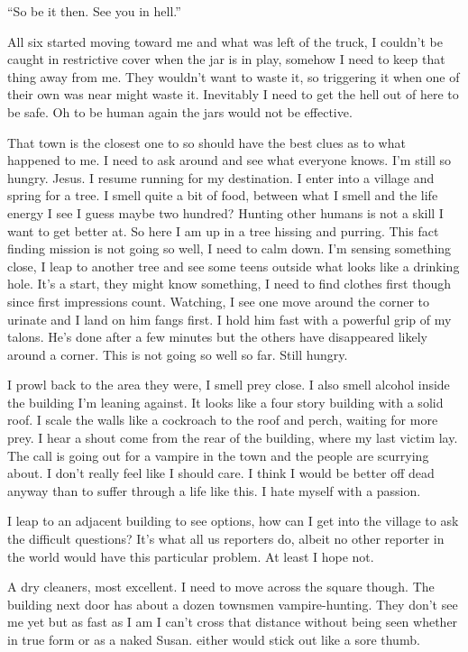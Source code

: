 ``So be it then. See you in hell.''

All six started moving toward me and what was left of the truck, I couldn't be caught in restrictive cover when the jar is in play, somehow I need to keep that thing away from me. They wouldn't want to waste it, so triggering it when one of their own was near might waste it. Inevitably I need to get the hell out of here to be safe. Oh to be human again the jars would not be effective.






That town is the closest one to \chichenitza so should have the best clues as to what happened to me. I need to ask around and see what everyone knows. I'm still so  hungry. Jesus. I resume running for my destination. I enter into a village and spring for a tree. I smell quite a bit of food, between what I smell and the life energy I see I guess maybe two hundred? Hunting other humans is not a skill I want to get better at. So here I am up in a tree hissing and purring. This fact finding mission is not going so well, I need to calm down. I'm sensing something close, I leap to another tree and see some teens outside what looks like a drinking hole. It's a start, they might know something, I need to find clothes first though since first impressions count. Watching, I see one move around the corner to urinate and I land on him fangs first. I hold him fast with a powerful grip of my talons. He's done after a few minutes but the others have disappeared likely around a corner. This is not going so well so far. Still hungry. 

I prowl back to the area they were, I smell prey close. I also smell alcohol inside the building I'm leaning against. It looks like a four story building with a solid roof. I scale the walls like a cockroach to the roof and perch, waiting for more prey. I hear a shout come from the rear of the building, where my last victim lay. The call is going out for a vampire in the town and the people are scurrying about. I don't really feel like I should care. I think I would be better off dead anyway than to suffer through a life like this. I hate myself with a passion. 

I leap to an adjacent building to see options, how can I get into the village to ask the difficult questions? It's what all us reporters do, albeit no other reporter in the world would have this particular problem. At least I hope not.

A dry cleaners, most excellent. I need to move across the square though. The building next door has about a dozen townsmen vampire-hunting. They don't see me yet but as fast as I am I can't cross that distance without being seen whether in true form or as a naked Susan. either would stick out like a sore thumb.


